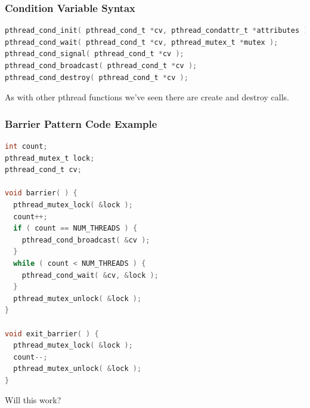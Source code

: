 \begin{frame}[fragile]
	\frametitle{Condition Variable Syntax}

	\begin{lstlisting}[language=C]
pthread_cond_init( pthread_cond_t *cv, pthread_condattr_t *attributes );
pthread_cond_wait( pthread_cond_t *cv, pthread_mutex_t *mutex );
pthread_cond_signal( pthread_cond_t *cv );
pthread_cond_broadcast( pthread_cond_t *cv );
pthread_cond_destroy( pthread_cond_t *cv );
\end{lstlisting}

	As with other pthread functions we've seen there are create and destroy calls.

\end{frame}

\begin{frame}[fragile]
	\frametitle{Barrier Pattern Code Example}
	\begin{lstlisting}[language=C]
int count;
pthread_mutex_t lock;
pthread_cond_t cv;

void barrier( ) {
  pthread_mutex_lock( &lock );
  count++;
  if ( count == NUM_THREADS ) {
    pthread_cond_broadcast( &cv );
  }
  while ( count < NUM_THREADS ) {
    pthread_cond_wait( &cv, &lock );
  }
  pthread_mutex_unlock( &lock );
}

void exit_barrier( ) {
  pthread_mutex_lock( &lock );
  count--;
  pthread_mutex_unlock( &lock );
}
\end{lstlisting}

	Will this work?

\end{frame}



